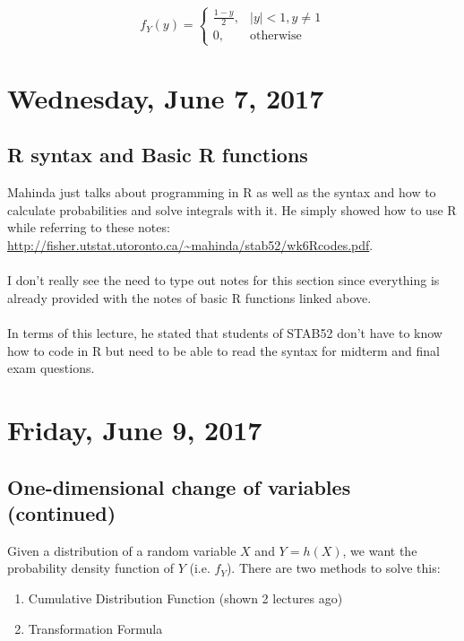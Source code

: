 \documentclass[12pt, twoside]{article}
\begin{document}
$$f_Y (y) = \begin{cases}
	\frac{1-y}{2}, & |y| < 1, y \neq 1\\
	0, & \text{otherwise}
\end{cases}
$$

\newpage

\section{Wednesday, June 7, 2017}

\subsection{R syntax and Basic R functions}

Mahinda just talks about programming in R as well as the syntax and how to calculate probabilities and solve integrals with it. He simply showed how to use R while referring to these notes:\\
\url{http://fisher.utstat.utoronto.ca/~mahinda/stab52/wk6Rcodes.pdf}.\\
\\
I don't really see the need to type out notes for this section since everything is already provided with the notes of basic R functions linked above.\\
\\
In terms of this lecture, he stated that students of STAB52 don't have to know how to code in R but need to be able to read the syntax for midterm and final exam questions.

\newpage

\section{Friday, June 9, 2017}

\subsection{One-dimensional change of variables (continued)}

Given a distribution of a random variable $X$ and $Y = h(X)$, we want the probability density function of $Y$ (i.e. $f_Y$). There are two methods to solve this:
\begin{enumerate}
	\item{Cumulative Distribution Function (shown 2 lectures ago)}
	\item{Transformation Formula}
\end{enumerate}
\end{document}
